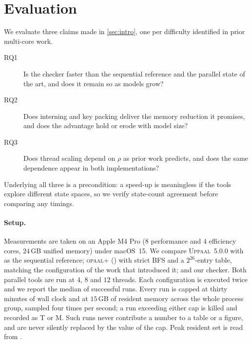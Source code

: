\section{Evaluation}\label{sec:eval}

We evaluate three claims made in \cref{sec:intro}, one per difficulty identified in prior
multi-core work.

\begin{description}
  \item[RQ1] Is the checker faster than the sequential reference and the parallel state of the
    art, and does it remain so as models grow?
  \item[RQ2] Does interning and key packing deliver the memory reduction it promises, and does
    the advantage hold or erode with model size?
  \item[RQ3] Does thread scaling depend on $\rho$ as prior work predicts, and does the same
    dependence appear in both implementations?
\end{description}

Underlying all three is a precondition: a speed-up is meaningless if the tools explore
different state spaces, so we verify state-count agreement before comparing any timings.

\paragraph*{Setup.}
Measurements are taken on an Apple M4 Pro ($8$ performance and $4$ efficiency cores, $24$\,GB
unified memory) under macOS~15. We compare \textsc{Uppaal}~5.0.0  with
 as the sequential reference; \textsc{opaal}+\ltsmin{} () with
strict BFS and a $2^{26}$-entry table, matching the configuration of the work that introduced
it; and our checker. Both parallel tools are run at $4$, $8$ and $12$ threads. Each
configuration is executed twice and we report the median of successful runs. Every run is
capped at thirty minutes of wall clock and at $15$\,GB of resident memory across the whole
process group, sampled four times per second; a run exceeding either cap is killed and
recorded as \textsf{T} or \textsf{M}. Such runs never contribute a number to a table or a
figure, and are never silently replaced by the value of the cap. Peak resident set is read
from .

